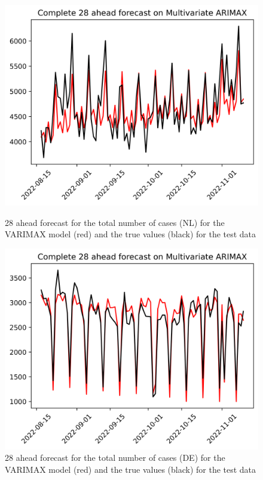 \begin{figure}

\begin{minipage}{.45\textwidth}
  \centering
  \includegraphics[width=\linewidth]{pics/28_ah/Complete_28_ahead_Multivariate ARIMAX.png}
  \caption{28 ahead forecast for the total number of cases (NL) for the VARIMAX model (red) and the true values (black) for the test data}
  \label{fig:tot_cases_fc_28_VARIMAX}
\end{minipage}
\begin{minipage}{.45\textwidth}
  \centering
  \includegraphics[width=\linewidth]{pics/28_ah/DE_Complete_28_ahead_Multivariate ARIMAX.png}
  \caption{28 ahead forecast for the total number of cases (DE) for the VARIMAX model (red) and the true values (black) for the test data}
  \label{fig:tot_cases_fc_28_VARIMAX_DE}
\end{minipage}

\end{figure}
